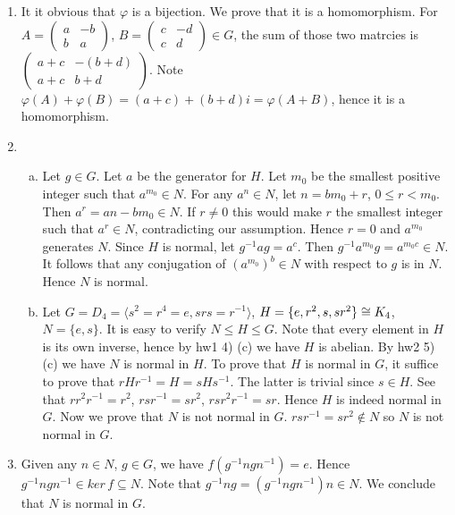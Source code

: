 \documentclass[A4paper,12pt]{article}
\theoremstyle{definition}
\numberwithin{equation}{section}
\begin{document}
\begin{enumerate}[1)]
    \item
        It it obvious that $\varphi$ is a bijection. 
        We prove that it is a homomorphism.
        For $A = \begin{pmatrix} a &-b \\ b &a\end{pmatrix}$, $B = \begin{pmatrix} c &-d \\ c &d\end{pmatrix} \in G$, the sum of those two matrcies is $\begin{pmatrix} a+c & -(b+d) \\ a+c & b+d \end{pmatrix}$.
        Note $\varphi(A) + \varphi(B) = (a+c) + (b+d)i = \varphi(A+B)$, hence it is a homomorphism.

    \item
        \begin{enumerate}[(a)]
            \item
                Let $g \in G$.
                Let $a$ be the generator for $H$.
                Let $m_0$ be the smallest positive integer such that $a^{m_0} \in N$. 
                For any $a^n \in N$, let $n = bm_0 + r$, $0 \leq r < m_0$. 
                Then $a^r = a{n - bm_0} \in N$.
                If $r\neq 0$ this would make $r$ the smallest integer such that $a^r \in N$, contradicting our assumption.
                Hence $r=0$ and $a^{m_0}$ generates $N$.
                Since $H$ is normal, let $g^{-1}ag = a^c$. Then $g^{-1}a^{m_0}g = a^{m_0c} \in N$. 
                It follows that any conjugation of $(a^{m_0})^b \in N$ with respect to $g$ is in $N$. Hence $N$ is normal.
            \item
                Let $G = D_4 = \langle s^2 = r^4 = e, srs=r^{-1}\rangle$, $\\ H =  \{e, r^2, s, sr^2\}\cong K_4$, $N = \{e, s\}$. It is easy to verify $N \le H \le G$.
                Note that every element in $H$ is its own inverse, hence by hw1 4) (c) we have $H$ is abelian. By hw2 5) (c) we have $N$ is normal in $H$.
                To prove that $H$ is normal in $G$, it suffice to prove that $rHr^{-1} = H = sHs^{-1}$. The latter is trivial since $s \in H$.
                See that $rr^2r^{-1} = r^2$, $rsr^{-1} = sr^2$, $rsr^2r^{-1} = sr$. Hence $H$ is indeed normal in $G$.
                Now we prove that $N$ is not normal in $G$.
                $rsr^{-1} = sr^2 \not \in N$ so $N$ is not normal in $G$.
                
        \end{enumerate}
        \item
            Given any $n \in N$, $g \in G$, we have $f(g^{-1}ngn^{-1}) = e$. Hence $g^{-1}ngn^{-1} \in ker\, f \subseteq N$.
            Note that $g^{-1}ng = (g^{-1}ngn^{-1})n \in N$.
            We conclude that $N$ is normal in $G$.
\end{enumerate}
\end{document}
